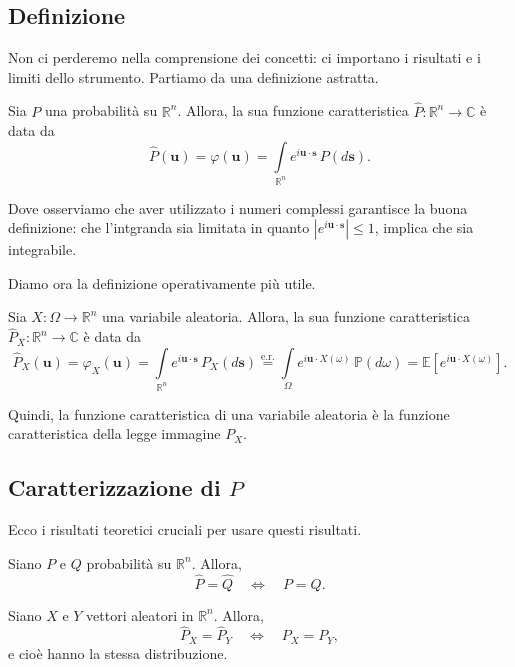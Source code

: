 \subsection{Definizione}

Non ci perderemo nella comprensione dei concetti: ci importano i risultati e i limiti dello strumento. Partiamo da una definizione astratta.

\begin{my_definition}
	Sia $P$ una probabilità su $\mathbb{R}^n$. Allora, la sua funzione caratteristica $\hat{P}:\mathbb{R}^n\to\mathbb{C}$ è data da
	\[
		\hat{P} (\mathbf{u}) = \varphi (\mathbf{u}) = \int \limits_{\mathbb{R}^n} e^{i \mathbf{u}\cdot\mathbf{s}} \, P(d\mathbf{s}).
	\]
\end{my_definition}

Dove osserviamo che aver utilizzato i numeri complessi garantisce la buona definizione: che l'intgranda sia limitata in quanto $\left| e^{i \mathbf{u} \cdot \mathbf{s}} \right| \leq 1$, implica che sia integrabile.

Diamo ora la definizione operativamente più utile.

\begin{my_definition}
	Sia $X:\Omega \to \mathbb{R}^n$ una variabile aleatoria. Allora, la sua funzione caratteristica $\hat{P}_X:\mathbb{R}^n\to\mathbb{C}$ è data da
	\[
		\hat{P}_X (\mathbf{u}) = 
		\varphi_X (\mathbf{u}) = 
		\int \limits_{\mathbb{R}^n} e^{i \mathbf{u}\cdot\mathbf{s}} \, P_X(d\mathbf{s})
		\overset{\mathrm{e.r.}}{=} \int \limits_{\Omega} e^{i \mathbf{u}\cdot X (\omega)} \, \mathbb{P}(d\omega) = \mathbb{E}\left[e^{i \mathbf{u}\cdot X (\omega)}\right].
	\]
\end{my_definition}

Quindi, la funzione caratteristica di una variabile aleatoria è la funzione caratteristica della legge immagine $P_X$.

\subsection{Caratterizzazione di $P$}

Ecco i risultati teoretici cruciali per usare questi risultati.

\begin{my_theorem}[Di Caratterizzazione]
	Siano $P$ e $Q$ probabilità su $\mathbb{R}^n$. Allora,
	\[
		\hat{P} = \hat{Q} \quad \iff \quad P = Q.	
	\]
\end{my_theorem}
\begin{my_corollary}
	Siano $X$ e $Y$ vettori aleatori in $\mathbb{R}^n$. Allora,
	\[
		\hat{P}_X = \hat{P}_Y \quad \iff \quad P_X = P_Y,	
	\]
	e cioè hanno la stessa distribuzione.
\end{my_corollary}

